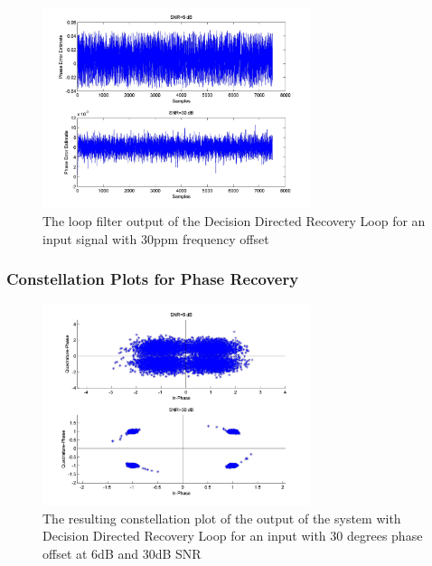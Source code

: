 \documentclass[]{article}
\begin{document}
\begin{figure}[H]
\centering
\hspace*{-2cm}\includegraphics[width=0.7\textwidth]{qpLoopFilterfo_ddr2.jpg}
\caption{The loop filter output of the Decision Directed Recovery Loop for an input signal with 30ppm frequency offset \label{fig:ddrTransFreq2}}
\end{figure}

\subsubsection{Constellation Plots  for Phase Recovery}
\begin{figure}[H]
\centering
\hspace*{-2cm}\includegraphics[width=0.7\textwidth]{qpConstpo_ddr1.jpg}
\caption{The resulting constellation plot of the output of the system with Decision Directed Recovery Loop for an input with 30 degrees phase offset at 6dB and 30dB SNR \label{fig:ddrConstPhase}}
\end{figure}
\end{document}
